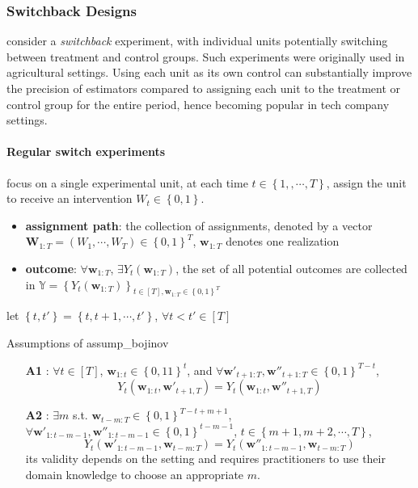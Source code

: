 \documentclass[twoside]{article}
\begin{document}
\subsubsection{Switchback Designs}
\citet{bojinov2023design} consider a \textit{switchback} experiment, with individual units potentially switching between treatment and control groups. Such experiments were originally used in agricultural settings.
Using each unit as its own control can substantially improve the precision of estimators compared to assigning each unit to the treatment or control group for the entire period, hence becoming popular in tech company settings.

\paragraph{Regular switch experiments}
\citet{bojinov2023design} focus on a single experimental unit, at each time $t\in \left\{1,,\cdots,T\right\}$, assign the unit to receive an intervention $W_t\in \left\{0,1\right\}$.
\begin{itemize}
    \item \textbf{assignment path}: the collection of assignments, denoted by a vector $\mathbf{W}_{1:T} = \left(W_1,\cdots,W_T\right)\in\left\{0,1\right\}^T$, $\mathbf{w}_{1:T}$ denotes one realization
    \item \textbf{outcome}: $\forall \mathbf{w}_{1:T}$, $\exists Y_t\left(\mathbf{w}_{1:T}\right)$, the set of all potential outcomes are collected in $\mathbb{Y} = \left\{Y_{t}\left(\mathbf{w}_{1:T}\right)\right\}_{t\in[T],\mathbf{w}_{1:T}\in\left\{0,1\right\}^T}$
\end{itemize}
let $\left\{t,t'\right\} = \left\{t,t+1,\cdots,t'\right\}$, $\forall t<t'\in[T]$
\begin{assumption}{Assumptions of \citet{bojinov2023design}}{assump_bojinov}
    \begin{itemize}
        \item[\textbf{A1}] : $\forall t\in[T]$, $\mathbf{w}_{1:t}\in\left\{0,11\right\}^t$, and $\forall \mathbf{w}'_{t+1:T},\mathbf{w}''_{t+1:T}\in\left\{0,1\right\}^{T-t}$, $$ Y_t\left(\mathbf{w}_{1:t},\mathbf{w}'_{t+1,T}\right) = Y_t\left(\mathbf{w}_{1:t},\mathbf{w}''_{t+1,T}\right) $$
        \item[\textbf{A2}] : $\exists m$ s.t. $\mathbf{w}_{t-m:T}\in\left\{0,1\right\}^{T-t+m+1}$, $\forall \mathbf{w}'_{1:t-m-1},\mathbf{w}''_{1:t-m-1}\in \left\{0,1\right\}^{t-m-1}$, $t\in \left\{m+1,m+2,\cdots,T\right\}$, $$ Y_t \left(\mathbf{w}'_{1:t-m-1},\mathbf{w}_{t-m:T}\right) = Y_t \left(\mathbf{w}''_{1:t-m-1},\mathbf{w}_{t-m:T}\right) $$
        its validity depends on the setting and requires practitioners to use their domain knowledge to choose an appropriate $m$. 
    \end{itemize}
\end{assumption}
\end{document}

